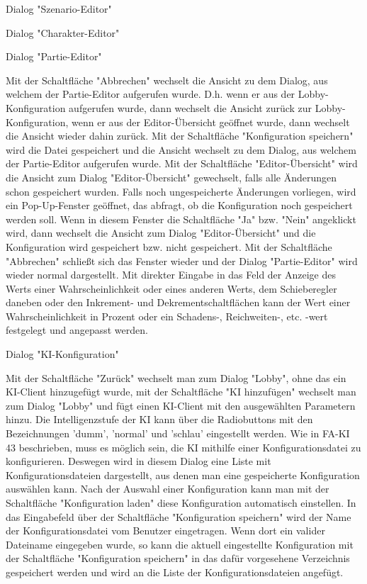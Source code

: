 Dialog "Szenario-Editor"

Dialog "Charakter-Editor"

Dialog "Partie-Editor"

Mit der Schaltfläche "Abbrechen" wechselt die Ansicht zu dem Dialog, aus welchem der Partie-Editor aufgerufen wurde. D.h. wenn er aus der Lobby-Konfiguration aufgerufen wurde, dann wechselt die Ansicht zurück zur Lobby-Konfiguration, wenn er aus der Editor-Übersicht geöffnet wurde, dann wechselt die Ansicht wieder dahin zurück.
Mit der Schaltfläche "Konfiguration speichern" wird die Datei gespeichert und die Ansicht wechselt zu dem Dialog,  aus welchem der Partie-Editor aufgerufen wurde.
Mit der Schaltfläche "Editor-Übersicht" wird die Ansicht zum Dialog "Editor-Übersicht" gewechselt, falls alle Änderungen schon gespeichert wurden. Falls noch ungespeicherte Änderungen vorliegen, wird ein Pop-Up-Fenster geöffnet, das abfragt, ob die Konfiguration noch gespeichert werden soll. Wenn in diesem Fenster die Schaltfläche "Ja" bzw. "Nein" angeklickt wird, dann wechselt die Ansicht zum Dialog "Editor-Übersicht" und die Konfiguration wird gespeichert bzw. nicht gespeichert. Mit der Schaltfläche "Abbrechen" schließt sich das Fenster wieder und der Dialog "Partie-Editor" wird wieder normal dargestellt.
Mit direkter Eingabe in das Feld der Anzeige des Werts einer Wahrscheinlichkeit oder eines anderen Werts, dem Schieberegler daneben oder den Inkrement- und Dekrementschaltflächen kann der Wert einer Wahrscheinlichkeit in Prozent oder ein Schadens-, Reichweiten-, etc. -wert festgelegt und angepasst werden.

Dialog "KI-Konfiguration"

Mit der Schaltfläche "Zurück" wechselt man zum Dialog "Lobby", ohne das ein KI-Client hinzugefügt wurde, mit der Schaltfläche "KI hinzufügen" wechselt man zum Dialog "Lobby" und fügt einen KI-Client mit den ausgewählten Parametern hinzu.
Die Intelligenzstufe der KI kann über die Radiobuttons mit den Bezeichnungen 'dumm', 'normal' und 'schlau' eingestellt werden.
Wie in FA-KI 43 beschrieben, muss es möglich sein, die KI mithilfe einer Konfigurationsdatei zu konfigurieren. Deswegen wird in diesem Dialog eine Liste mit Konfigurationsdateien dargestellt, aus denen man eine gespeicherte Konfiguration auswählen kann. Nach der Auswahl einer Konfiguration kann man mit der Schaltfläche "Konfiguration laden" diese Konfiguration automatisch einstellen.
In das Eingabefeld über der Schaltfläche "Konfiguration speichern" wird der Name der Konfigurationsdatei vom Benutzer eingetragen. Wenn dort ein valider Dateiname eingegeben wurde, so kann die aktuell eingestellte Konfiguration mit der Schaltfläche "Konfiguration speichern" in das dafür vorgesehene Verzeichnis gespeichert werden und wird an die Liste der Konfigurationsdateien angefügt.